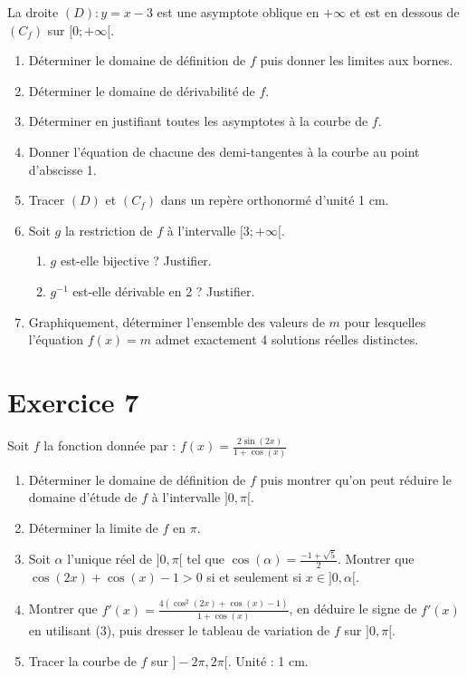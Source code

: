 \documentclass[12pt]{article}
\begin{document}
La droite $(D) : y = x - 3$ est une asymptote oblique en $+\infty$ et est en dessous de $(C_f)$ sur $[0; +\infty[$.


\begin{enumerate}
    \item Déterminer le domaine de définition de $f$ puis donner les limites aux bornes.
    \item Déterminer le domaine de dérivabilité de $f$.
    \item Déterminer en justifiant toutes les asymptotes à la courbe de $f$.
    \item Donner l'équation de chacune des demi-tangentes à la courbe au point d'abscisse 1.
    \item Tracer $(D)$ et $(C_f)$ dans un repère orthonormé d'unité 1 cm.
    \item Soit $g$ la restriction de $f$ à l'intervalle $[3; +\infty[$.
    \begin{enumerate}
        \item $g$ est-elle bijective ? Justifier.
        \item $g^{-1}$ est-elle dérivable en 2 ? Justifier.
    \end{enumerate}
    \item Graphiquement, déterminer l'ensemble des valeurs de $m$ pour lesquelles l'équation $f(x) = m$ admet exactement 4 solutions réelles distinctes.
\end{enumerate}
\section*{Exercice 7}

Soit $f$ la fonction donnée par : $f(x) = \frac{2 \sin(2x)}{1 + \cos(x)}$

\begin{enumerate}
    \item Déterminer le domaine de définition de $f$ puis montrer qu’on peut réduire le domaine d’étude de $f$ à l’intervalle $]0, \pi[$.
    \item Déterminer la limite de $f$ en $\pi$.
    \item Soit $\alpha$ l’unique réel de $]0, \pi[$ tel que $\cos(\alpha) = \frac{-1 + \sqrt{5}}{2}$. Montrer que $\cos(2x) + \cos(x) - 1 > 0$ si et seulement si $x \in ]0, \alpha[$.
    \item Montrer que $f'(x) = \frac{4( \cos^2(2x) + \cos(x) - 1)}{1 + \cos(x)}$, en déduire le signe de $f'(x)$ en utilisant (3), puis dresser le tableau de variation de $f$ sur $]0, \pi[$.
    \item Tracer la courbe de $f$ sur $]-2\pi, 2\pi[$. Unité : 1 cm.
\end{enumerate}
\end{document}
